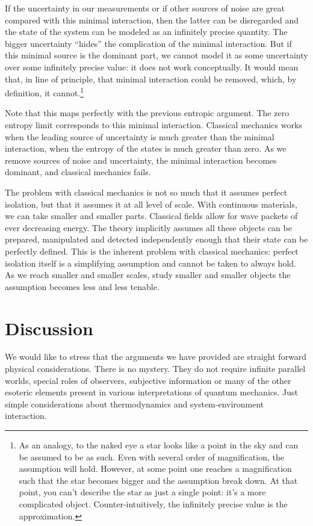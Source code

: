 \documentclass[10pt,twocolumn, nofootinbib]{revtex4-2}
\begin{document}
If the uncertainty in our measurements or if other sources of noise are great compared with this minimal interaction, then the latter can be disregarded and the state of the system can be modeled as an infinitely precise quantity. The bigger uncertainty ``hides'' the complication of the minimal interaction. But if this minimal source is the dominant part, we cannot model it as some uncertainty over some infinitely precise value: it does not work conceptually. It would mean that, in line of principle, that minimal interaction could be removed, which, by definition, it cannot.\footnote{As an analogy, to the naked eye a star looks like a point in the sky and can be assumed to be as such. Even with several order of magnification, the assumption will hold. However, at some point one reaches a magnification such that the star becomes bigger and the assumption break down. At that point, you can't describe the star as just a single point: it's a more complicated object. Counter-intuitively, the infinitely precise value is the approximation.}

Note that this maps perfectly with the previous entropic argument. The zero entropy limit corresponds to this minimal interaction. Classical mechanics works when the leading source of uncertainty is much greater than the minimal interaction, when the entropy of the states is much greater than zero. As we remove sources of noise and uncertainty, the minimal interaction becomes dominant, and classical mechanics fails.

The problem with classical mechanics is not so much that it assumes perfect isolation, but that it assumes it at all level of scale. With continuous materials, we can take smaller and smaller parts. Classical fields allow for wave packets of ever decreasing energy. The theory implicitly assumes all these objects can be prepared, manipulated and detected independently enough that their state can be perfectly defined. This is the inherent problem with classical mechanics: perfect isolation itself is a simplifying assumption and cannot be taken to always hold. As we reach smaller and smaller scales, study smaller and smaller objects the assumption becomes less and less tenable.

\section{Discussion}

We would like to stress that the arguments we have provided are straight forward physical considerations. There is no mystery. They do not require infinite parallel worlds, special roles of observers, subjective information or many of the other esoteric elements present in various interpretations of quantum mechanics. Just simple considerations about thermodynamics and system-environment interaction. 
\end{document}

